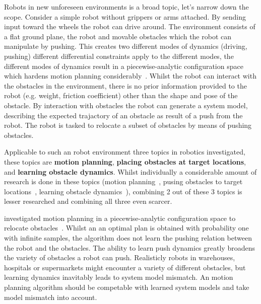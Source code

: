 Robots in new unforeseen environments is a broad topic, let's narrow down the scope. Consider a simple robot without grippers or arms attached. By sending input toward the wheels the robot can drive around. The environment consists of a flat ground plane, the robot and movable obstacles which the robot can manipulate by pushing. This creates two different modes of dynamics (driving, pushing) different differential constraints apply to the different modes, the different modes of dynamics result in a piecewise-analytic configuration space which hardens motion planning considerably~\cite{vega-brown_asymptotically_2020}. Whilst the robot can interact with the obstacles in the environment, there is no prior information provided to the robot (e.g. weight, friction coefficient) other than the shape and pose of the obstacle. By interaction with obstacles the robot can generate a system model, describing the expected trajactory of an obstacle as result of a push from the robot. The robot is tasked to relocate a subset of obstacles by means of pushing obstacles. \bs

Applicable to such an robot environment three topics in robotics investigated, these topics are \textbf{motion planning}, \textbf{placing obstacles at target locations}, and \textbf{learning obstacle dynamics}. Whilst individually a considerable amount of research is done in these topics (motion planning~\cite{lavalle_planning_2006,elbanhawi_samplingbased_2014,kingston_samplingbased_2018,chen_fast_2018}, pusing obstacles to target locations~\cite{arruda_uncertainty_2017,mericli_pushmanipulation_2015,toussaint_sequenceofconstraints_2022,stuber_let_2020,stuber_featurebased_2018,bauza_dataefficient_2018}, learning obstacle dynamics~\cite{seegmiller_vehicle_2013,cong_selfadapting_2020}), combining 2 out of these 3 topics is lesser researched and combining all three even scarcer.\bs

\citeauthor{vega-brown_asymptotically_2020} investigated motion planning in a piecewise-analytic configuration space to relocate obstacles~\cite{vega-brown_asymptotically_2020}. Whilst an an optimal plan is obtained with probability one with infinite samples, the algorithm does not learn the pushing relation between the robot and the obstacles. The ability to learn push dynamics greatly broadens the variety of obstacles a robot can push. Realisticly robots in warehouses, hospitals or supermarkets might encounter a variety of different obstacles, but learning dynamics inavitably leads to system model mismatch. An motion planning algorithm should be competable with learned system models and take model mismatch into account.\bs

